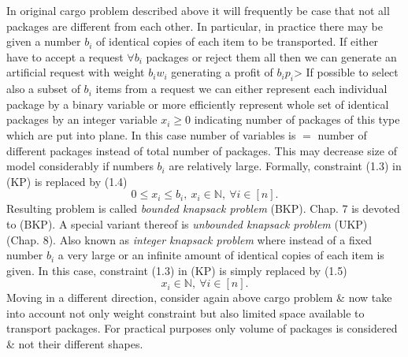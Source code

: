 \documentclass{article}
\begin{document}
\begin{itemize}
\begin{itemize}
        In original cargo problem described above it will frequently be case that not all packages are different from each other. In particular, in practice there may be given a number $b_i$ of identical copies of each item to be transported. If either have to accept a request $\forall b_i$ packages or reject them all then we can generate an artificial request with weight $b_iw_i$ generating a profit of $b_ip_i$> If possible to select also a subset of $b_i$ items from a request we can either represent each individual package by a binary variable or more efficiently represent whole set of identical packages by an integer variable $x_i\ge0$ indicating number of packages of this type which are put into plane. In this case number of variables is $=$ number of different packages instead of total number of packages. This may decrease size of model considerably if numbers $b_i$ are relatively large. Formally, constraint (1.3) in (KP) is replaced by (1.4)
        \begin{equation*}
            0\le x_i\le b_i,\ x_i\in\mathbb{N},\ \forall i\in[n].
        \end{equation*}
        Resulting problem is called {\it bounded knapsack problem} (BKP). Chap. 7 is devoted to (BKP). A special variant thereof is {\it unbounded knapsack problem} (UKP) (Chap. 8). Also known as {\it integer knapsack problem} where instead of a fixed number $b_i$ a very large or an infinite amount of identical copies of each item is given. In this case, constraint (1.3) in (KP) is simply replaced by (1.5)
        \begin{equation*}
            x_i\in\mathbb{N},\ \forall i\in[n].
        \end{equation*}
        Moving in a different direction, consider again above cargo problem \& now take into account not only weight constraint but also limited space available to transport packages. For practical purposes only volume of packages is considered \& not their different shapes.
        

\end{itemize}
\end{itemize}
\end{document}
